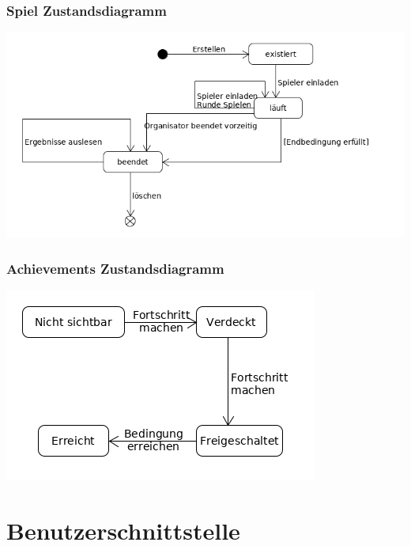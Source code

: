 \documentclass[a4paper]{scrreprt}
\begin{document}
    \subsection{Spiel Zustandsdiagramm}
    \label{fig:Spiel_State}
    \includegraphics[width=\textwidth]{uml/export/Spiel_Zustand.png}
    \subsection{Achievements Zustandsdiagramm}
    \label{fig:Achievment_State}
    \includegraphics[width=\textwidth]{uml/export/Achievment_State.png}
    

    \chapter{Benutzerschnittstelle}
\end{document}
